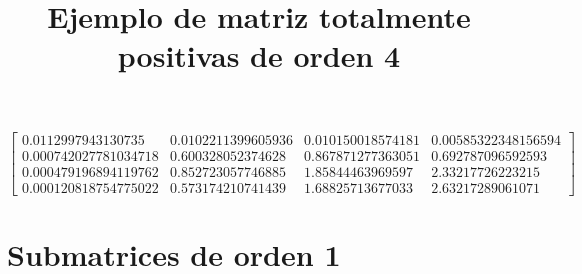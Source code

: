 \documentclass[12pt]{article}
\begin{document}
\title{Ejemplo de matriz totalmente positivas de orden 4}
\maketitle

$$\left[\begin{matrix}0.0112997943130735 & 0.0102211399605936 & 0.010150018574181 & 0.00585322348156594\\0.000742027781034718 & 0.600328052374628 & 0.867871277363051 & 0.692787096592593\\0.000479196894119762 & 0.852723057746885 & 1.85844463969597 & 2.33217726223215\\0.000120818754775022 & 0.573174210741439 & 1.68825713677033 & 2.63217289061071\end{matrix}\right]$$


\section*{Submatrices de orden 1}
\end{document}
